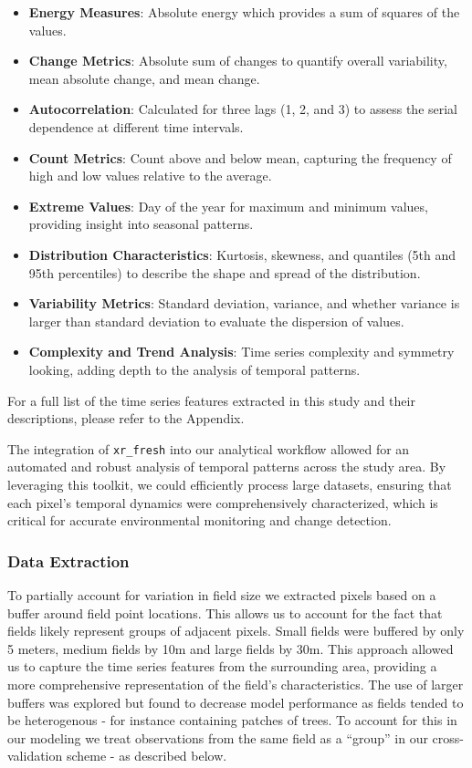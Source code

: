 \documentclass[
]{article}
\providecommand{\tightlist}{%
  \setlength{\itemsep}{0pt}\setlength{\parskip}{0pt}}
\begin{document}
\begin{itemize}
\tightlist
\item
  \textbf{Energy Measures}: Absolute energy which provides a sum of
  squares of the values.
\item
  \textbf{Change Metrics}: Absolute sum of changes to quantify overall
  variability, mean absolute change, and mean change.
\item
  \textbf{Autocorrelation}: Calculated for three lags (1, 2, and 3) to
  assess the serial dependence at different time intervals.
\item
  \textbf{Count Metrics}: Count above and below mean, capturing the
  frequency of high and low values relative to the average.
\item
  \textbf{Extreme Values}: Day of the year for maximum and minimum
  values, providing insight into seasonal patterns.
\item
  \textbf{Distribution Characteristics}: Kurtosis, skewness, and
  quantiles (5th and 95th percentiles) to describe the shape and spread
  of the distribution.
\item
  \textbf{Variability Metrics}: Standard deviation, variance, and
  whether variance is larger than standard deviation to evaluate the
  dispersion of values.
\item
  \textbf{Complexity and Trend Analysis}: Time series complexity and
  symmetry looking, adding depth to the analysis of temporal patterns.
\end{itemize}

For a full list of the time series features extracted in this study and
their descriptions, please refer to the Appendix.

The integration of \texttt{xr\_fresh} into our analytical workflow
allowed for an automated and robust analysis of temporal patterns across
the study area. By leveraging this toolkit, we could efficiently process
large datasets, ensuring that each pixel's temporal dynamics were
comprehensively characterized, which is critical for accurate
environmental monitoring and change detection.

\hypertarget{data-extraction}{%
\subsubsection{Data Extraction}\label{data-extraction}}

To partially account for variation in field size we extracted pixels
based on a buffer around field point locations. This allows us to
account for the fact that fields likely represent groups of adjacent
pixels. Small fields were buffered by only 5 meters, medium fields by
10m and large fields by 30m. This approach allowed us to capture the
time series features from the surrounding area, providing a more
comprehensive representation of the field's characteristics. The use of
larger buffers was explored but found to decrease model performance as
fields tended to be heterogenous - for instance containing patches of
trees. To account for this in our modeling we treat observations from
the same field as a ``group'' in our cross-validation scheme - as
described below.
\end{document}
